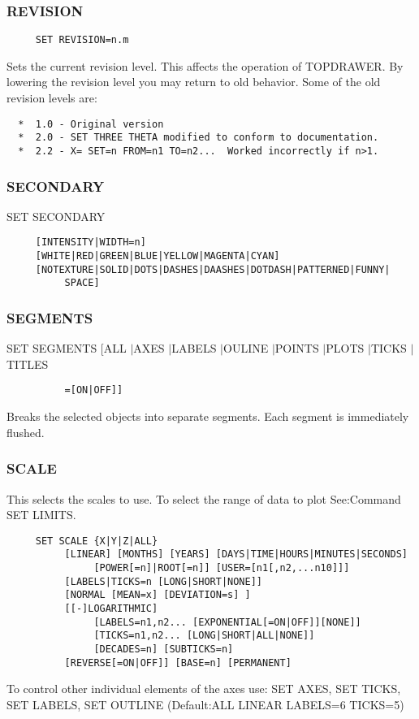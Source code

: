 \subsubsection{REVISION}
\begin{verbatim}
     SET REVISION=n.m 
\end{verbatim}
Sets  the  current  revision  level.   This  affects  the  operation of
TOPDRAWER.  By lowering the  revision  level  you  may  return  to  old
behavior.  Some of the old revision levels are:  
\begin{verbatim}
  *  1.0 - Original version 
  *  2.0 - SET THREE THETA modified to conform to documentation.  
  *  2.2 - X= SET=n FROM=n1 TO=n2...  Worked incorrectly if n>1.  
\end{verbatim}
\subsubsection{SECONDARY}
SET SECONDARY 
\begin{verbatim}
     [INTENSITY|WIDTH=n] 
     [WHITE|RED|GREEN|BLUE|YELLOW|MAGENTA|CYAN] 
     [NOTEXTURE|SOLID|DOTS|DASHES|DAASHES|DOTDASH|PATTERNED|FUNNY|
          SPACE] 
\end{verbatim}
\subsubsection{SEGMENTS}
SET SEGMENTS [ALL $|$AXES $|$LABELS $|$OULINE $|$POINTS $|$PLOTS $|$TICKS $|$TITLES
\begin{verbatim}
          =[ON|OFF]] 
\end{verbatim}
Breaks the selected objects into separate segments.  Each segment is
immediately flushed.  
\subsubsection{SCALE}
This selects the scales to use.  To select the range of data to plot
See:Command SET LIMITS.  
\begin{verbatim}
     SET SCALE {X|Y|Z|ALL} 
          [LINEAR] [MONTHS] [YEARS] [DAYS|TIME|HOURS|MINUTES|SECONDS]
               [POWER[=n]|ROOT[=n]] [USER=[n1[,n2,...n10]]] 
          [LABELS|TICKS=n [LONG|SHORT|NONE]] 
          [NORMAL [MEAN=x] [DEVIATION=s] ] 
          [[-]LOGARITHMIC] 
               [LABELS=n1,n2... [EXPONENTIAL[=ON|OFF]][NONE]] 
               [TICKS=n1,n2... [LONG|SHORT|ALL|NONE]] 
               [DECADES=n] [SUBTICKS=n] 
          [REVERSE[=ON|OFF]] [BASE=n] [PERMANENT] 
\end{verbatim}
To control other individual elements of the axes use:  
SET AXES,   SET TICKS,   SET LABELS,  SET OUTLINE  (Default:ALL  LINEAR
LABELS=6 TICKS=5) 
